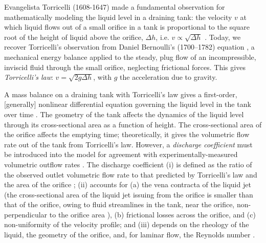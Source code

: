 \documentclass[openacc]{rsproca_new}%
\begin{document}

Evangelista Torricelli (1608-1647) made a fundamental observation for mathematically modeling the liquid level in a draining tank: the velocity $v$ at which liquid flows out of a small orifice in a tank is proportional to the square root of the height of liquid above the orifice, $\Delta h$, i.e. $v\propto \sqrt{\Delta h}$ \cite{mills1982newton}.
Today, we recover Torricelli's observation from Daniel Bernoulli's (1700–1782) equation \cite{welty2020fundamentals}, a mechanical energy balance applied to the steady, plug flow of an incompressible, inviscid fluid through the small orifice, neglecting frictional forces. This gives \emph{Torricelli's law}: $v=\sqrt{2 g \Delta h}$, with $g$ the acceleration due to gravity. \cite{d2021torricelli,teoman2022discharge}

A mass balance on a draining tank with Torricelli's law gives a first-order, [generally] nonlinear differential equation governing the liquid level in the tank over time \cite{groetsch1993inverse,seborg2016process,debook}.
The geometry of the tank affects the dynamics of the liquid level through its cross-sectional area as a function of height.
The cross-sectional area of the orifice affects the emptying time; theoretically, it gives the volumetric flow rate out of the tank from Torricelli's law. 
However, a \emph{discharge coefficient} \cite{de2000pin,blasone2015discharge,wadhwa2021study,liu2008drainage} must be introduced into the model for agreement with experimentally-measured volumetric outflow rates \cite{farmer1992physical,driver1998torricelli,brady2009siphons,rother2024modelling,paldy1963apparatus,ivanov2014testing,williams2021vessel,pavesi2019investigating,planinvsivc2011holes,saleta2005experimental,lopac2015water,powell2012carrying}.
The discharge coefficient \cite{teoman2022discharge,hicks2014determining,blasone2015discharge,lienhard1984velocity,wadhwa2021study}
(i) is defined as the ratio of the observed outlet volumetric flow rate to that predicted by Torricelli's law and the area of the orifice \cite{hicks2014determining};
(ii) accounts for (a) the vena contracta of the liquid jet (the cross-sectional area of the liquid jet issuing from the orifice is smaller than that of the orifice, owing to fluid streamlines in the tank, near the orifice, non-perpendicular to the orifice area \cite{horsch2020simple}), (b) frictional losses across the orifice, and (c) non-uniformity of the velocity profile; and
(iii) depends on the rheology of the liquid, the geometry of the orifice, and, for laminar flow, the Reynolds number \cite{teoman2022discharge}. 
\end{document}
